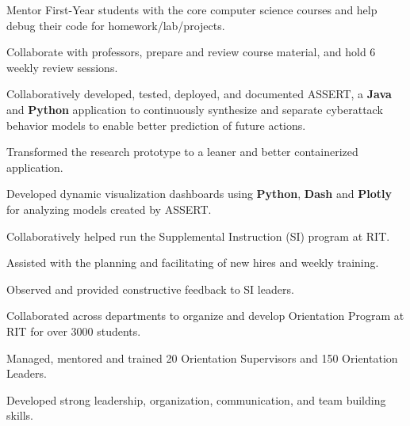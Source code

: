 \documentclass[]{deedy-resume-openfont}
\begin{document}
\begin{minipage}[t]{0.67\textwidth}
\begin{tightemize}
  \item Mentor First-Year students with the core computer science courses and help debug their code for homework/lab/projects.
  \item Collaborate with professors, prepare and review course material, and hold 6 weekly review sessions.
\end{tightemize}
\begin{tightemize}
  \item Collaboratively developed, tested, deployed, and documented ASSERT, a \textbf{Java} and \textbf{Python} application to continuously synthesize and separate cyberattack behavior models to enable better prediction of future actions.
  \item Transformed the research prototype to a leaner and better containerized application.
  \item Developed dynamic visualization dashboards using \textbf{Python}, \textbf{Dash} and \textbf{Plotly} for analyzing models created by ASSERT.
\end{tightemize}
\begin{tightemize}
  \item Collaboratively helped run the Supplemental Instruction (SI) program at RIT.
  \item Assisted with the planning and facilitating of new hires and weekly training.
  \item Observed and provided constructive feedback to SI leaders.
\end{tightemize}
\begin{tightemize}
  \item Collaborated across departments to organize and develop Orientation Program at RIT for over 3000 students.
  \item Managed, mentored and trained 20 Orientation Supervisors and 150 Orientation Leaders.
  \item Developed strong leadership, organization, communication, and team building skills.
\end{tightemize}



\end{minipage}
\end{document}
